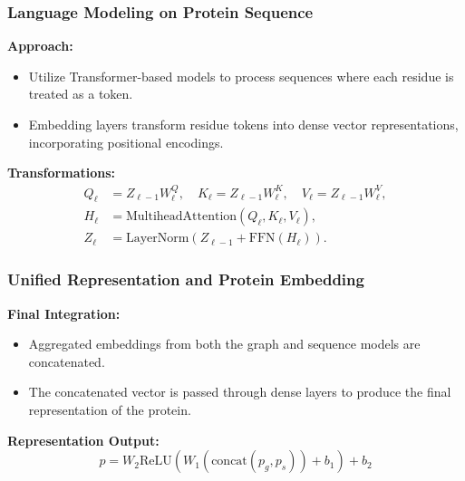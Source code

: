 \documentclass[11pt,xcolor={dvipsnames},hyperref={pdftex,pdfpagemode=UseNone,hidelinks,pdfdisplaydoctitle=true},usepdftitle=false]{beamer}
\begin{document}
\begin{frame}
\frametitle{Language Modeling on Protein Sequence}
\textbf{Approach:}
\begin{itemize}
    \item Utilize Transformer-based models to process sequences where each residue is treated as a token.
    \item Embedding layers transform residue tokens into dense vector representations, incorporating positional encodings.
\end{itemize}

\textbf{Transformations:}
\begin{align*}
    Q_\ell &= Z_{\ell-1} W_\ell^Q, \quad K_\ell = Z_{\ell-1} W_\ell^K, \quad V_\ell = Z_{\ell-1} W_\ell^V, \\
    H_\ell &= \text{MultiheadAttention}(Q_\ell, K_\ell, V_\ell), \\
    Z_\ell &= \text{LayerNorm}(Z_{\ell-1} + \text{FFN}(H_\ell)).
\end{align*}

\end{frame}

\begin{frame}
\frametitle{Unified Representation and Protein Embedding}
\textbf{Final Integration:}
\begin{itemize}
    \item Aggregated embeddings from both the graph and sequence models are concatenated.
    \item The concatenated vector is passed through dense layers to produce the final representation of the protein.
\end{itemize}

\textbf{Representation Output:}
\begin{equation*}
    p = W_2 \text{ReLU}(W_1 (\text{concat}(p_g, p_s)) + b_1) + b_2
\end{equation*}

\end{frame}


\end{document}
